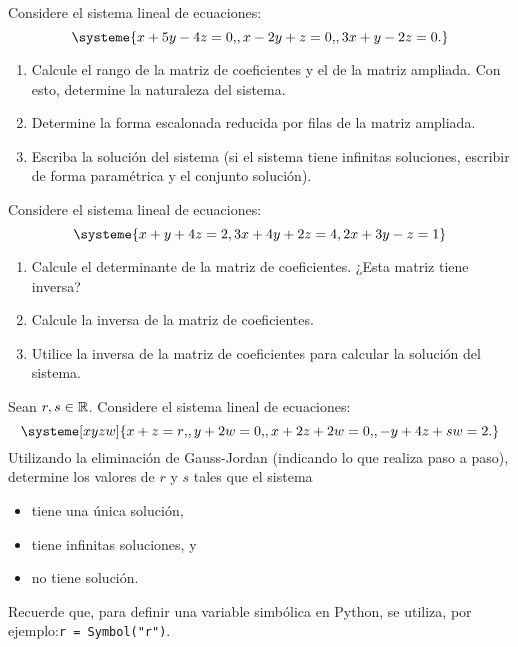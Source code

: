 \documentclass[12pt,a4]{aleph-examen}
\begin{document}
\begin{preguntas}

\item 
    Considere el sistema lineal de ecuaciones:
    \[
        \systeme{x+5y-4z=0{,}, x-2y+z=0{,}, 3x+y-2z=0{.}}
    \]
    \begin{enumerate}
        \item Calcule el rango de la matriz de coeficientes y el de la matriz ampliada. Con esto, determine la naturaleza del sistema.
        \item Determine la forma escalonada reducida por filas de la matriz ampliada.
        \item Escriba la solución del sistema (si el sistema tiene infinitas soluciones, escribir de forma paramétrica y el conjunto solución).
    \end{enumerate}

\item 
    Considere el sistema lineal de ecuaciones:
    \[
        \systeme{x+y+4 z=2, 3x+4y+2z=4, 2x+3y-z=1}
    \]
    \begin{enumerate}
        \item Calcule el determinante de la matriz de coeficientes. ¿Esta matriz tiene inversa?
        \item Calcule la inversa de la matriz de coeficientes.
        \item Utilice la inversa de la matriz de coeficientes para calcular la solución del sistema.
    \end{enumerate}

\item Sean $r,s \in \mathbb{R}$. Considere el sistema lineal de ecuaciones:
    \[
        \systeme[xyzw]{x + z = r{,}, 
        y + 2w = 0{,}, 
        x + 2z + 2w = 0{,}, 
        -y + 4z + sw =2{.}}
    \]
    Utilizando la eliminación de Gauss-Jordan (indicando lo que realiza paso a paso), determine los valores de $r$ y $s$ tales que el sistema
    \begin{itemize}
        \item tiene una única solución,
        \item tiene infinitas soluciones, y
        \item no tiene solución.
    \end{itemize}
    Recuerde que, para definir una variable simbólica en Python, se utiliza, por ejemplo:\linebreak \verb+r = Symbol("r")+.


\end{preguntas}
\end{document}
